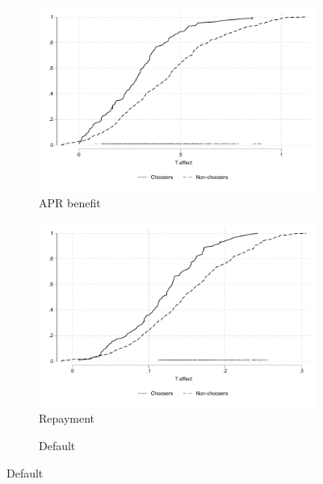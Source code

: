 \documentclass[oneside,11pt]{article}
\begin{document}
{    
\begin{figure}[H]
    \caption{Negative selection on treatment effects}
    \label{benefit_vs_choice_cdf}
    \begin{center}
    \begin{subfigure}{0.475\textwidth}
        \caption{APR benefit}
        \centering
        \includegraphics[width=\textwidth]{Figuras/cdf_predchoose_tau_apr.pdf}
    \end{subfigure}
    \begin{subfigure}{0.475\textwidth}
        \caption{Repayment}
        \centering
        \includegraphics[width=\textwidth]{Figuras/cdf_predchoose_tau_des.pdf}
    \end{subfigure}
    \begin{subfigure}{0.475\textwidth}
        \caption{Default}
        \centering

\end{subfigure}
\end{center}
\end{figure}}
\end{document}
